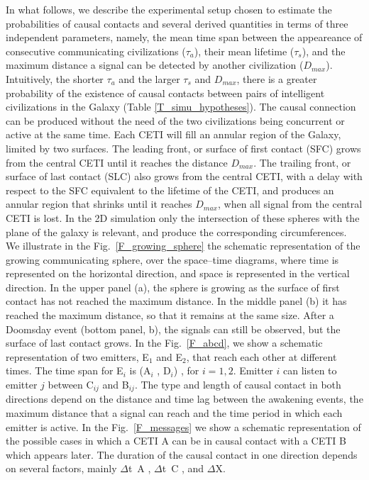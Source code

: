 \documentclass[crop]{CSLB}%
\begin{document}
In what follows, we describe the experimental setup chosen to estimate
the probabilities of causal contacts and several derived quantities in
terms of three independent parameters, namely, the mean time span
between the appeareance of consecutive communicating civilizations
($\tau_a$), their mean lifetime ($\tau_s$), and the maximum distance a
signal can be detected by another civilization ($D_{max}$).
%
Intuitively, the shorter $\tau_a$ and the larger $\tau_s$ and
$D_{max}$, there is a greater probability of the existence of causal
contacts between pairs of intelligent civilizations in the Galaxy
(Table \ref{T_simu_hypotheses}).
%
The causal connection can be produced without the need of the two
civilizations being concurrent or active at the same time.
%
Each CETI will fill an annular region of the Galaxy, limited by two
surfaces.
%
The leading front, or surface of first contact (SFC) grows from the
central CETI until it reaches the distance $D_{max}$.
%
The trailing front, or surface of last contact (SLC) also grows from
the central CETI, with a delay with respect to the SFC equivalent to
the lifetime of the CETI, and produces an annular region that shrinks
until it reaches $D_{max}$, when all signal from the central CETI is
lost.
%
In the 2D simulation only the intersection of these spheres with the
plane of the galaxy is relevant, and produce the corresponding
circumferences.
%
We illustrate in the Fig.~\ref{F_growing_sphere} the schematic
representation of the growing communicating sphere, over the
space–time diagrams, where time is represented on the horizontal
direction, and space is represented in the vertical direction.
%
In the upper panel (a), the sphere is growing as the surface of first
contact has not reached the maximum distance.
%
In the middle panel (b) it has reached the maximum distance, so that
it remains at the same size.
%
After a Doomsday event (bottom panel, b), the signals can still be
observed, but the surface of last contact grows.
%
In the Fig.~\ref{F_abcd}, we show a schematic representation of two
emitters, E$_1$ and E$_2$, that reach each other at different times.
%
The time span for E$_i$ is (A$_i$ , D$_i$) , for $i = {1, 2}$.
%
Emitter $i$ can listen to emitter $j$ between C$_{ij}$ and B$_{ij}$.
%
The type and length of causal contact in both directions depend on the
distance and time lag between the awakening events, the maximum
distance that a signal can reach and the time period in which each
emitter is active.
%
In the Fig.~\ref{F_messages} we show a schematic representation of the
possible cases in which a CETI A can be in causal contact with a CETI
B which appears later.
%
The duration of the causal contact in one direction depends on several
factors, mainly $\Delta$t~A , $\Delta$t~C , and $\Delta$X.
\end{document}
